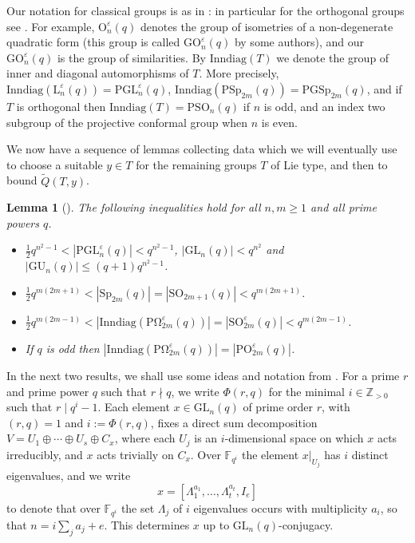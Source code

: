 \documentclass[twoside,a4paper,reqno,11pt]{amsart}
\newcommand{\QQ}{\widetilde{Q}}
\newcommand{\e}{\varepsilon}
\newcommand\bbF{\mathbb{F}}
\newcommand{\<}{\langle}
\renewcommand{\>}{\rangle}
\newcommand{\leqs}{\leqslant}
\newcommand{\geqs}{\geqslant}
\newcommand{\GL}{\mathrm{GL}}
\newcommand{\PGL}{\mathrm{PGL}}
\newcommand{\PSp}{\mathrm{PSp}}
\newcommand{\Sp}{\mathrm{Sp}}
\newcommand{\POmega}{\mathrm{P\Omega}}
\newcommand{\LL}{\mathrm{L}}
\newcommand{\GU}{\mathrm{GU}}
\newtheorem{lem}[thm]{Lemma}
\theoremstyle{definition}
\begin{document}
Our notation for classical groups is as in \cite{BG_classical}: in particular for the orthogonal groups see \cite[Section 2.5]{BG_classical}. For example,  $\mathrm{O}^{\varepsilon}_n(q)$ denotes the group of isometries of a non-degenerate quadratic form (this group is called $\mathrm{GO}_n^\e(q)$ by some authors), and our $\mathrm{GO}_n^\e(q)$ is the group of similarities. 
By $\mathrm{Inndiag}(T)$ we denote the group of inner and diagonal automorphisms of $T$. More precisely, $\mathrm{Inndiag}(\LL_n^\e(q)) = \PGL_n^\e(q)$, $\mathrm{Inndiag}(\PSp_{2m}(q)) = \mathrm{PGSp}_{2m}(q)$, and if $T$ is orthogonal then $\mathrm{Inndiag}(T) = \mathrm{PSO}_n(q)$ if $n$ is odd, and an index two subgroup of the projective conformal group 
when $n$ is even. 

We now have a sequence of lemmas collecting data which we will eventually use to choose a suitable $y \in T$ for the remaining groups $T$ of Lie type, and then to bound $\QQ(T, y)$.

\begin{lem}[{\cite[Proposition~3.9]{B_fpr2}}]
	\label{l:order}
	The following inequalities hold for all $n,m\geqs 1$ and all prime powers $q$. 
	\begin{itemize}\addtolength{\itemsep}{0.2\baselineskip}
		\item[{\rm (i)}] $\frac{1}{2}q^{n^2-1} < |\PGL_n^\e(q)| < q^{n^2-1}$, $|\GL_n(q)| < q^{n^2}$ and $|\GU_n(q)| \leqs (q+1)q^{n^2-1}$.
		\item[{\rm (ii)}] $\frac{1}{2}q^{m(2m+1)} <  |\Sp_{2m}(q)| = |\mathrm{SO}_{2m+1}(q)| < q^{m(2m+1)}$.
		\item[{\rm (iii)}] $\frac{1}{2}q^{m(2m-1)}< |\mathrm{Inndiag}(\POmega_{2m}^\e(q))| = |\mathrm{SO}_{2m}^\e(q)| < q^{m(2m-1)}$.
		\item[{\rm (iv)}] If $q$ is odd then $|\mathrm{Inndiag}(\POmega_{2m}^\e(q))| = |\mathrm{PO}_{2m}^\e(q)|$.
	\end{itemize}
\end{lem}



In the next two results, we shall use some ideas and notation from \cite[Section 3.2.1]{BG_classical}. 
For a prime $r$ and prime power $q$ such that $r \nmid q$, we write $\Phi(r, q)$ for the minimal $i \in \mathbb{Z}_{>0}$ such that $r \mid q^i-1$.
Each element $x \in \GL_n(q)$ of prime order $r$, with $(r, q) = 1$ and $i := \Phi(r, q)$, fixes a direct sum decomposition $V = U_1 \oplus \cdots \oplus U_s \oplus C_x$, where each $U_j$ is an $i$-dimensional space on which $x$ acts irreducibly, and $x$ acts trivially on $C_x$. Over $\bbF_{q^i}$ the element $x|_{U_j}$ has $i$ distinct eigenvalues, and we write
$$x = [\Lambda_1^{a_1}, \ldots, \Lambda_t^{a_t}, I_e]$$ to denote that over $\bbF_{q^i}$ the set $\Lambda_j$ of $i$ eigenvalues occurs with multiplicity $a_i$, so that $n = i\sum_{j}a_j + e$. This determines $x$ up to $\GL_n(q)$-conjugacy.
 
\end{document}
